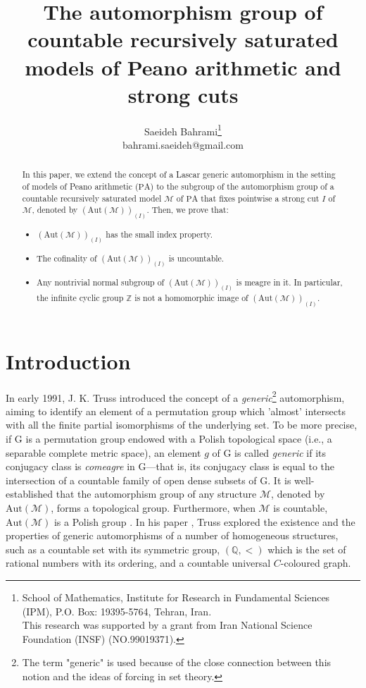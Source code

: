 \documentclass[11pt]{article}
\theoremstyle{plain}
\theoremstyle{definition}
\newcommand{\M}{\mathcal{M}}
\newcommand{\G}{\mathrm{G}}
\newcommand{\A}{\mathrm{Aut}}
\newcommand{\pa}{\mathrm{PA}}
\begin{document}
\title{The automorphism group of countable recursively saturated models of Peano arithmetic and strong cuts}
\author{Saeideh Bahrami\footnote{
		School of Mathematics, Institute for Research in Fundamental Sciences (IPM), P.O. Box: 19395-5764, Tehran, Iran.\\
		This research was  supported by a grant from Iran National Science Foundation (INSF) (NO.99019371).} \\
	
	{\small {bahrami.saeideh@gmail.com}}}
\maketitle

\begin{abstract}
In this paper, we extend the concept of a Lascar generic automorphism in the setting of models of Peano arithmetic ($\pa$) to the subgroup of the automorphism group of a countable recursively saturated model $\M$ of $\pa$ that fixes pointwise a strong cut $I$ of $\M$, denoted by $(\A(\M))_{(I)}$. Then, we prove that:
\begin{itemize}
\item[(1)] $(\A(\M))_{(I)}$ has the small index property.
\item[(2)] The cofinality of $(\A(\M))_{(I)}$ is uncountable.
\item[(3)] Any nontrivial normal subgroup of  $(\A(\M))_{(I)}$ is meagre in it. In particular, the infinite cyclic group $\mathbb{Z}$ is not a homomorphic image of $(\A(\M))_{(I)}$.
\end{itemize} 
\end{abstract}

\section{Introduction}
In  early 1991, J. K. Truss introduced \cite{trusss} the concept of a \textit{generic}\footnote{The term "generic" is used because of the close connection between this notion and the ideas of forcing in set theory.} automorphism, aiming to identify an  element of a permutation group which 'almost' intersects with  all the finite partial isomorphisms of the underlying set. To be more precise, if $\G$ is a permutation group endowed with a Polish topological space (i.e., a  separable complete metric space),    an element $g$ of $\G$ is called \textit{generic} if its conjugacy class is \textit{comeagre} in  $\G$---that is, its conjugacy class is equal to the intersection of a countable family of open dense subsets of $\G$.  It is well-established that  the  automorphism group of any structure $ \M $, denoted by $ \A(\M) $, forms a topological group. Furthermore, when $ \M $ is countable, $ \A(\M) $ is a Polish group  \cite{km}. In his paper \cite{trusss}, Truss explored the existence and the properties of generic automorphisms of a number of homogeneous structures, such as a countable set with its symmetric group, $ (\mathbb{Q},<) $ which is the set of rational numbers with its ordering, and a countable universal $ C $-coloured graph. 
\end{document}
